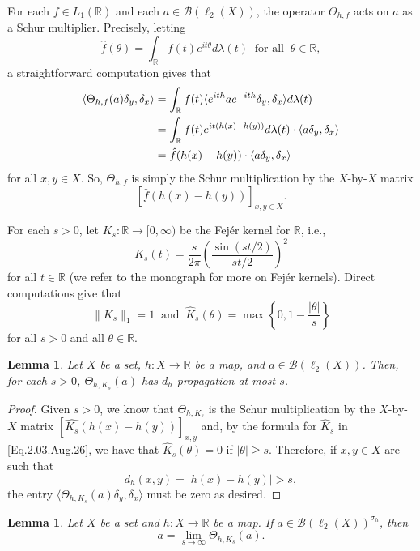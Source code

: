 \documentclass[11pt]{amsart}
\newcommand{\R}{\mathbb{R}}
\newcommand{\cB}{\mathcal{B}}
\numberwithin{equation}{section}
\newtheorem{lemma}[theorem]{Lemma}
\theoremstyle{definition}
\theoremstyle{remark}
\begin{document}
For each $f\in L_1(\R)$ and each $a\in \cB(\ell_2(X))$, the operator $\Theta_{h,f}$ acts on $a$ as a Schur multiplier. Precisely, letting
\[\hat f(\theta)=\int_\R f(t)e^{it\theta}d\lambda(t)\ \text{ for all }\ \theta\in \R,\]
a straightforward computation gives that
\begin{align}\label{Eq.Theta.Schur.mult}
\langle \Theta_{h,f}(a)\delta_y,\delta_x\rangle& = \int_\R f(t)\langle e^{ith}ae^{-ith}\delta_y,\delta_x\rangle d\lambda(t)  \\
&= \int_\R f(t) e^{it(h(x)-h(y))} d\lambda(t) \cdot\langle a\delta_y,\delta_x\rangle\notag \\
&=\hat f(h(x)-h(y))\cdot \langle a\delta_y,\delta_x\rangle\notag
\end{align}
for all $x,y\in X$.
So, $\Theta_{h,f}$ is simply the Schur multiplication by the $X$-by-$X$ matrix \[[\hat f(h(x)-h(y))]_{x,y\in X}.\]

  For each $s>0$, let $K_s\colon \R\to [0,\infty)$ be the Fejér kernel for $\R$, i.e.,
\begin{equation}\label{Eq.Fejér.kernel}
K_s(t)=\frac{s}{2\pi}\left(\frac{\sin(s t/2)}{s t /2}\right)^2
\end{equation}
for all $t\in \R$ (we refer to the monograph \cite{Katznelson2004} for more on Fejér kernels). Direct computations give that
\begin{equation}\label{Eq.2.03.Aug.26}\|K_s\|_1=1\ \text{ and }\ \hat K_s(\theta)=\max\left\{0,1-\frac{|\theta|}{s}\right\} \end{equation}
for all $s>0$ and all $\theta\in \R$.


\begin{lemma}
\label{Lemma.support.ThetaKsa}
Let $X$ be a set, $h\colon X\to \R$ be a map, and $a\in \cB(\ell_2(X))$. Then, for each $s>0$, $\Theta_{h,K_s}(a)$ has $d_h$-propagation at most $s$.
\end{lemma}

\begin{proof}
Given $s>0$, we know that $\Theta_{h,K_s}$ is the Schur multiplication by the $X$-by-$X$ matrix $[\hat{K_s}(h(x)-h(y))]_{x,y}$ and, by the formula for $\hat K_s$ in \eqref{Eq.2.03.Aug.26}, we have that $\hat K_s(\theta)=0$ if $|\theta|\geq s$. Therefore, if $x,y\in X$ are such that \[d_h(x,y)=|h(x)-h(y)|>s,\] the entry $\langle \Theta_{h,K_s}(a)\delta_y,\delta_x\rangle$ must be zero as desired.
\end{proof}

\begin{lemma}\label{Lemma.ThetaKs(a).tends.to.a}
    Let $X$ be a set and $h\colon X\to \R$ be a map. If $a\in \cB(\ell_2(X))^{\sigma_h}$, then \[a=\lim_{s\to \infty}\Theta_{h,K_s}(a).\]
\end{lemma}
\end{document}
